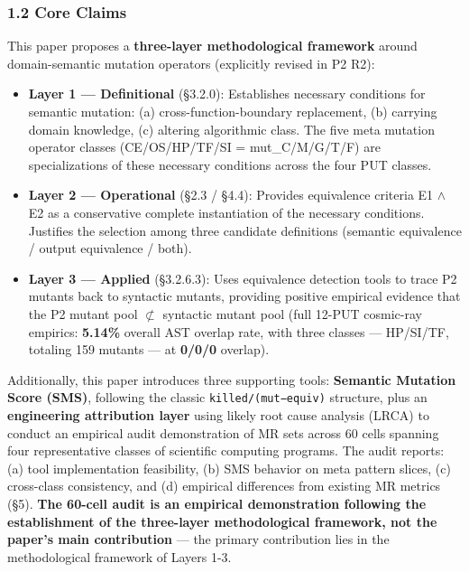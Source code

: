 \documentclass[review,12pt,authoryear]{elsarticle}
\providecommand{\tightlist}{\setlength{\itemsep}{0pt}\setlength{\parskip}{0pt}}
\begin{document}
\subsubsection{1.2 Core Claims}\label{core-claims}

This paper proposes a \textbf{three-layer methodological framework}
around domain-semantic mutation operators (explicitly revised in P2 R2):

\begin{itemize}
\tightlist
\item
  \textbf{Layer 1 --- Definitional} (§3.2.0): Establishes necessary
  conditions for semantic mutation: (a) cross-function-boundary
  replacement, (b) carrying domain knowledge, (c) altering algorithmic
  class. The five meta mutation operator classes (CE/OS/HP/TF/SI =
  mut\_C/M/G/T/F) are specializations of these necessary conditions
  across the four PUT classes.
\item
  \textbf{Layer 2 --- Operational} (§2.3 / §4.4): Provides equivalence
  criteria E1 $\wedge$ E2 as a conservative complete instantiation of the
  necessary conditions. Justifies the selection among three candidate
  definitions (semantic equivalence / output equivalence / both).
\item
  \textbf{Layer 3 --- Applied} (§3.2.6.3): Uses equivalence detection
  tools to trace P2 mutants back to syntactic mutants, providing
  positive empirical evidence that the P2 mutant pool $\not\subset$ syntactic mutant
  pool (full 12-PUT cosmic-ray empirics: \textbf{5.14\%} overall AST
  overlap rate, with three classes --- HP/SI/TF, totaling 159 mutants
  --- at \textbf{0/0/0} overlap).
\end{itemize}

Additionally, this paper introduces three supporting tools:
\textbf{Semantic Mutation Score (SMS)}, following the classic
\texttt{killed/(mut−equiv)} structure, plus an \textbf{engineering
attribution layer} using likely root cause analysis (LRCA) to conduct an
empirical audit demonstration of MR sets across 60 cells spanning four
representative classes of scientific computing programs. The audit
reports: (a) tool implementation feasibility, (b) SMS behavior on meta
pattern slices, (c) cross-class consistency, and (d) empirical
differences from existing MR metrics (§5). \textbf{The 60-cell audit is
an empirical demonstration following the establishment of the
three-layer methodological framework, not the paper's main contribution}
--- the primary contribution lies in the methodological framework of
Layers 1-3.
\end{document}
